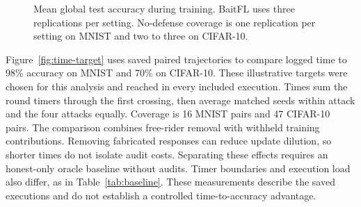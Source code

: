 \documentclass[conference]{IEEEtran}
\begin{document}
\begin{figure}[t]
\par{}
\caption{Mean global test accuracy during training. BaitFL uses three replications per setting. No-defense coverage is one replication per setting on MNIST and two to three on CIFAR-10.}\label{fig:accuracy-comparison}
\end{figure}



Figure~\ref{fig:time-target} uses saved paired trajectories to compare
logged time to 98\% accuracy on MNIST and 70\% on CIFAR-10. These
illustrative targets were chosen for this analysis and reached in every
included execution. Times sum the round timers through the first crossing,
then average matched seeds within attack and the four attacks equally.
Coverage is 16 MNIST pairs and
47 CIFAR-10 pairs. The comparison combines
free-rider removal with withheld training contributions. Removing
fabricated responses can reduce update dilution, so shorter times do
not isolate audit costs. Separating these effects requires an honest-only
oracle baseline without audits. Timer boundaries and execution load also
differ, as in Table~\ref{tab:baseline}. These measurements describe the
saved executions and do not establish a controlled time-to-accuracy advantage.
\end{document}
